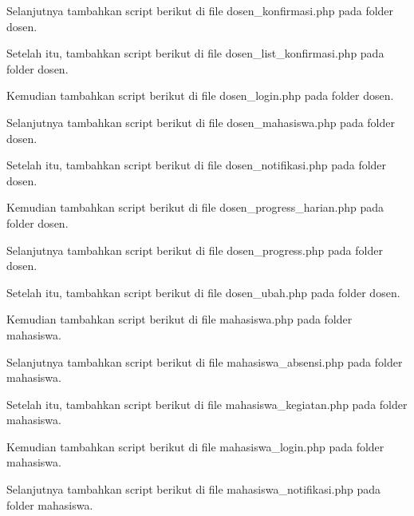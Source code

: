 \noindent
Selanjutnya tambahkan script berikut di file dosen\_konfirmasi.php pada folder dosen.


\noindent
Setelah itu, tambahkan script berikut di file dosen\_list\_konfirmasi.php pada folder dosen.


\noindent
Kemudian tambahkan script berikut di file dosen\_login.php pada folder dosen.


\noindent
Selanjutnya tambahkan script berikut di file dosen\_mahasiswa.php pada folder dosen.


\noindent
Setelah itu, tambahkan script berikut di file dosen\_notifikasi.php pada folder dosen.


\noindent
Kemudian tambahkan script berikut di file dosen\_progress\_harian.php pada folder dosen.


\noindent
Selanjutnya tambahkan script berikut di file dosen\_progress.php pada folder dosen.


\noindent
Setelah itu, tambahkan script berikut di file dosen\_ubah.php pada folder dosen.


\noindent
Kemudian tambahkan script berikut di file mahasiswa.php pada folder mahasiswa.


\noindent
Selanjutnya tambahkan script berikut di file mahasiswa\_absensi.php pada folder mahasiswa.


\noindent
Setelah itu, tambahkan script berikut di file mahasiswa\_kegiatan.php pada folder mahasiswa.


\noindent
Kemudian tambahkan script berikut di file mahasiswa\_login.php pada folder mahasiswa.


\noindent
Selanjutnya tambahkan script berikut di file mahasiswa\_notifikasi.php pada folder mahasiswa.


